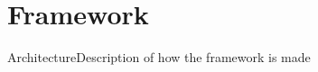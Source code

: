 \section{Framework}


\begin{myframe}{Architecture}{Description of how the framework is made}
\end{myframe}
